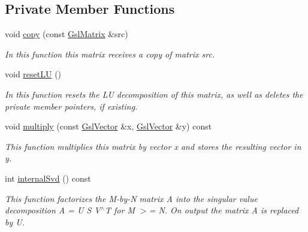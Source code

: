 \subsection*{Private Member Functions}
\begin{DoxyCompactItemize}
\item 
void \hyperlink{class_q_u_e_s_o_1_1_gsl_matrix_a63a17ab71da636c9177cd1c3a04faf61}{copy} (const \hyperlink{class_q_u_e_s_o_1_1_gsl_matrix}{Gsl\-Matrix} \&src)
\begin{DoxyCompactList}\small\item\em In this function {\ttfamily this} matrix receives a copy of matrix {\ttfamily src}. \end{DoxyCompactList}\item 
void \hyperlink{class_q_u_e_s_o_1_1_gsl_matrix_ab55ec308530e4135a719181a6351840c}{reset\-L\-U} ()
\begin{DoxyCompactList}\small\item\em In this function resets the L\-U decomposition of {\ttfamily this} matrix, as well as deletes the private member pointers, if existing. \end{DoxyCompactList}\item 
void \hyperlink{class_q_u_e_s_o_1_1_gsl_matrix_acbf8b79dce54e51cc699810305ae7964}{multiply} (const \hyperlink{class_q_u_e_s_o_1_1_gsl_vector}{Gsl\-Vector} \&x, \hyperlink{class_q_u_e_s_o_1_1_gsl_vector}{Gsl\-Vector} \&y) const 
\begin{DoxyCompactList}\small\item\em This function multiplies {\ttfamily this} matrix by vector {\ttfamily x} and stores the resulting vector in {\ttfamily y}. \end{DoxyCompactList}\item 
int \hyperlink{class_q_u_e_s_o_1_1_gsl_matrix_a971c0fcee50b741419f4f2322329647f}{internal\-Svd} () const 
\begin{DoxyCompactList}\small\item\em This function factorizes the M-\/by-\/\-N matrix A into the singular value decomposition A = U S V$^\wedge$\-T for M $>$= N. On output the matrix A is replaced by U. \end{DoxyCompactList}\end{DoxyCompactItemize}
